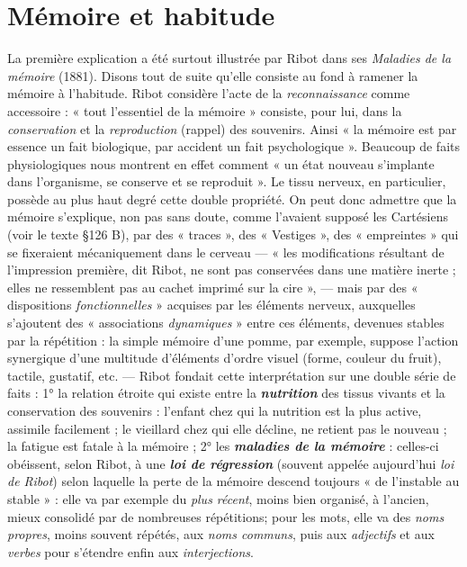 \section{Mémoire et habitude}%
La première explication a été
surtout illustrée par Ribot dans ses {\it Maladies de la mémoire} (1881).
Disons tout de suite qu’elle consiste au fond à ramener la mémoire à
l'habitude. Ribot considère l’acte de la {\it reconnaissance} comme accessoire :
« tout l'essentiel de la mémoire » consiste, pour lui, dans
la {\it conservation} et la {\it reproduction} (rappel) des souvenirs. Ainsi « la
mémoire est par essence un fait biologique, par accident un fait psychologique ».
Beaucoup de faits physiologiques nous montrent en
effet comment « un état nouveau s'implante dans l’organisme, se
conserve et se reproduit ». Le tissu nerveux, en particulier, possède
au plus haut degré cette double propriété. On peut donc admettre
que la mémoire s’explique, non pas sans doute, comme l'avaient
supposé les Cartésiens (voir le texte \S 126 B), par des « traces », des
« Vestiges », des « empreintes » qui se fixeraient mécaniquement dans
le cerveau — « les modifications résultant de l'impression première,
dit Ribot, ne sont pas conservées dans une matière inerte ; elles ne
ressemblent pas au cachet imprimé sur la cire », — mais par des
« dispositions {\it fonctionnelles} » acquises par les éléments nerveux, auxquelles
s’ajoutent des « associations {\it dynamiques} » entre ces éléments,
devenues stables par la répétition : la simple mémoire d’une pomme,
par exemple, suppose l’action synergique d’une multitude d’éléments
d’ordre visuel (forme, couleur du fruit), tactile, gustatif, etc. — Ribot
fondait cette interprétation sur une double série de faits : 1° la relation
étroite qui existe entre la \textbf{\textit {nutrition}} des tissus vivants et la conservation
des souvenirs : l’enfant chez qui la nutrition est la plus
active, assimile facilement ; le vieillard chez qui elle décline, ne retient
pas le nouveau ; la fatigue est fatale à la mémoire ; 2° les \textbf{\textit {maladies de
la mémoire}} : celles-ci obéissent, selon Ribot, à une \textbf{\textit {loi de régression}}
(souvent appelée aujourd’hui {\it loi de Ribot}) selon laquelle la perte de
la mémoire descend toujours « de l’instable au stable » : elle va par
exemple du {\it plus récent}, moins bien organisé, à l’ancien, mieux consolidé
par de nombreuses répétitions; pour les mots, elle va des {\it noms
propres}, moins souvent répétés, aux {\it noms communs}, puis aux {\it adjectifs}
et aux {\it verbes} pour s'étendre enfin aux {\it interjections}.

